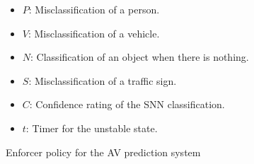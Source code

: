 \begin{figure}[t]
	\centering
	\scalebox{1.3}{}

	\begin{itemize}
		\item $P$: Misclassification of a person.
		\item $V$: Misclassification of a vehicle.
		\item $N$: Classification of an object when there is nothing.
		\item $S$: Misclassification of a traffic sign.
		\item $C$: Confidence rating of the \ac{SNN} classification.
		\item $t$: Timer for the unstable state.
	\end{itemize}
	
	\caption{Enforcer policy for the AV prediction system}
	\label{fig:signrte}
\end{figure}

















